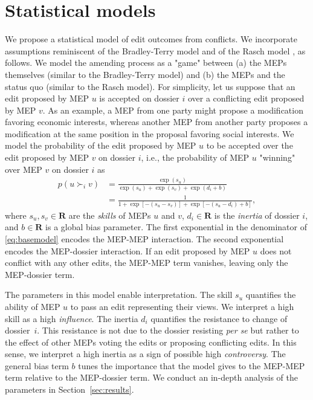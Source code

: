\section{Statistical models}
\label{sec:models}

We propose a statistical model of edit outcomes from conflicts.
We incorporate assumptions reminiscent of the Bradley-Terry model \cite{bradley1952rank} and of the Rasch model \cite{rasch1960probabilistic}, as follows.
We model the amending process as a "game" between (a) the MEPs themselves (similar to the Bradley-Terry model) and (b) the MEPs and the status quo (similar to the Rasch model).
For simplicity, let us suppose that an edit proposed by MEP $u$ is accepted on dossier $i$ over a conflicting edit proposed by MEP $v$.
As an example, a MEP from one party might propose a modification favoring economic interests, whereas another MEP from another party proposes a modification at the same position in the proposal favoring social interests.
We model the probability of the edit proposed by MEP $u$ to be accepted over the edit proposed by MEP $v$ on dossier $i$, i.e., the  probability of MEP $u$ "winning" over MEP $v$ on dossier $i$ as
\begin{align}
	\label{eq:basemodel}
	p( u \succ_i v )
	 & = \frac{\exp(s_u)}{\exp(s_u) + \exp(s_v) + \exp(d_i + b)} \nonumber  \\
	 & = \frac{1}{1 + \exp[ -( s_u - s_v ) ] + \exp[ -( s_u - d_i ) + b ]},
\end{align}
where $ s_u, s_v \in \mathbf{R} $ are the \textit{skills} of MEPs $u$ and $v$, $ d_i \in \mathbf{R} $ is the \textit{inertia} of dossier $i$, and $ b \in \mathbf{R} $ is a global bias parameter.
The first exponential in the denominator of \eqref{eq:basemodel} encodes the MEP-MEP interaction.
The second exponential encodes the MEP-dossier interaction.
If an edit proposed by MEP $u$ does not conflict with any other edits, the MEP-MEP term vanishes, leaving only the MEP-dossier term.

The parameters in this model enable interpretation.
The skill $s_u$ quantifies the ability of MEP $u$ to pass an edit representing their views.
We interpret a high skill as a high \textit{influence}.
The inertia $d_i$ quantifies the resistance to change of dossier~$i$.
This resistance is not due to the dossier resisting \textit{per se} but rather to the effect of other MEPs voting the edits or proposing conflicting edits.
In this sense, we interpret a high inertia as a sign of possible high \textit{controversy}.
The general bias term $b$ tunes the importance that the model gives to the MEP-MEP term relative to the MEP-dossier term.
We conduct an in-depth analysis of the parameters in Section~\ref{sec:results}.

